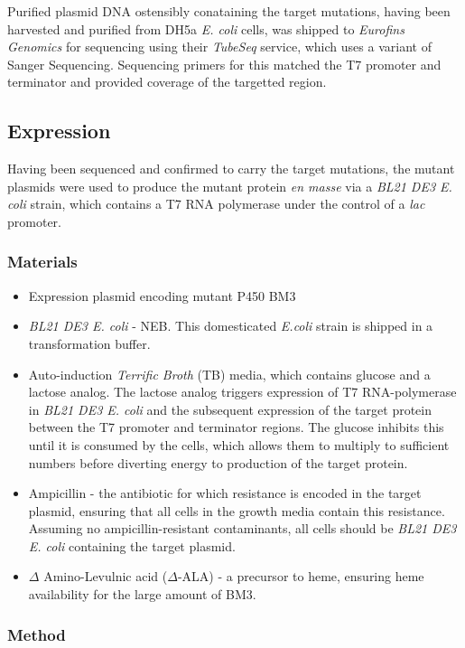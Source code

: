 \documentclass{article}
\begin{document}
Purified plasmid DNA ostensibly conataining the target mutations, having been harvested and purified from DH5a \textit{E. coli} cells, was shipped to \textit{Eurofins Genomics} for sequencing using their \textit{TubeSeq} service, which uses a variant of Sanger Sequencing.
Sequencing primers for this matched the T7 promoter and terminator and provided coverage of the targetted region.


\subsection{Expression}

Having been sequenced and confirmed to carry the target mutations, the mutant plasmids were used to produce the mutant protein \textit{en masse} via a \textit{BL21 DE3 E. coli} strain, which contains a T7 RNA polymerase under the control of a \textit{lac} promoter.

\subsubsection{Materials}

\begin{itemize}
	\item Expression plasmid encoding mutant P450 BM3
	\item \textit{BL21 DE3 E. coli} - NEB. This domesticated \textit{E.coli} strain is shipped in a transformation buffer.
	\item Auto-induction \textit{Terrific Broth} (TB) media, which contains glucose and a lactose analog. 
	The lactose analog triggers expression of T7 RNA-polymerase in \textit{BL21 DE3 E. coli} and the subsequent expression of the target protein between the T7 promoter and terminator regions. 
	The glucose inhibits this until it is consumed by the cells, which allows them to multiply to sufficient numbers before diverting energy to production of the target protein.
	\item Ampicillin - the antibiotic for which resistance is encoded in the target plasmid, ensuring that all cells in the growth media contain this resistance.
	Assuming no ampicillin-resistant contaminants, all cells should be \textit{BL21 DE3 E. coli} containing the target plasmid.
	\item $\Delta$ Amino-Levulnic acid ($\Delta$-ALA) - a precursor to heme, ensuring heme availability for the large amount of BM3.
\end{itemize}

\subsubsection{Method}
\end{document}
